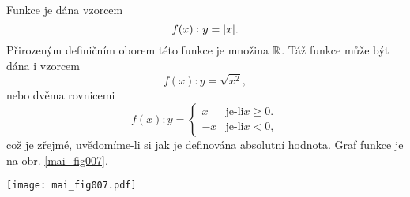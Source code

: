 \wikitextrule
\begin{example}\label{MAI:exam019} 
  Funkce je dána vzorcem 
  \begin{equation*}
    f(x):y=\lvert x\rvert.
  \end{equation*} 
  Přirozeným definičním oborem této funkce je množina $\mathbb{R}$. Táž funkce může být dána i 
  vzorcem
  \begin{equation*}
    f(x):y=\sqrt{x^2},
  \end{equation*}    
  nebo dvěma rovnicemi
  \begin{equation*}
    f(x):y=
       \begin{cases}
           x & \text{je-li} x \geq 0. \\
          -x & \text{je-li} x < 0,
       \end{cases}                 
  \end{equation*}  
  což je zřejmé, uvědomíme-li si jak je definována absolutní hodnota. Graf funkce je na obr. 
  \ref{mai_fig007}.
  
  {\centering
   \captionsetup{type=figure}
%  
   \texttt{[image: mai\_fig007.pdf]}
   \label{mai_fig007}
  \par}
\end{example}